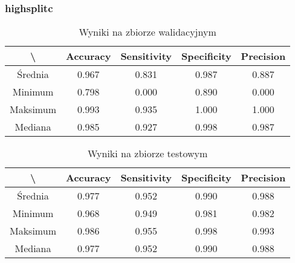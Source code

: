 \newpage
\subsubsection{highsplitc}

\begin{table}[!h]
	\centering
	\caption{Wyniki na zbiorze walidacyjnym}
	\vspace{6pt}
	{\footnotesize
		\begin{tabular}{|c|c|c|c|c|}
      \hline \textbackslash & Accuracy & Sensitivity & Specificity & Precision \\
      \hline Średnia & 0.967 & 0.831 & 0.987 & 0.887 \\
      \hline Minimum & 0.798 & 0.000 & 0.890 & 0.000 \\
      \hline Maksimum & 0.993 & 0.935 & 1.000 & 1.000 \\
      \hline Mediana & 0.985 & 0.927 & 0.998 & 0.987 \\
      \hline
		\end{tabular}
	}
	\vspace{0pt}
\end{table}

\begin{table}[!h]
	\centering
	\caption{Wyniki na zbiorze testowym}
	\vspace{6pt}
	{\footnotesize
		\begin{tabular}{|c|c|c|c|c|}
      \hline \textbackslash & Accuracy & Sensitivity & Specificity & Precision \\
      \hline Średnia & 0.977 & 0.952 & 0.990 & 0.988 \\
      \hline Minimum & 0.968 & 0.949 & 0.981 & 0.982 \\
      \hline Maksimum & 0.986 & 0.955 & 0.998 & 0.993 \\
      \hline Mediana & 0.977 & 0.952 & 0.990 & 0.988 \\
      \hline
		\end{tabular}
	}
	\vspace{0pt}
\end{table}
